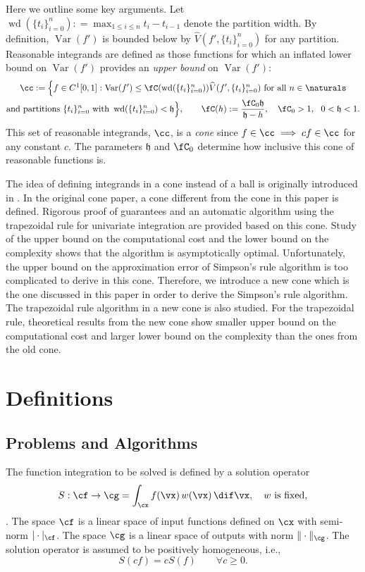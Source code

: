 \documentclass[]{elsarticle}
\DeclareMathOperator{\Var}{Var}
\theoremstyle{definition}
\theoremstyle{remark}
\DeclareMathOperator{\size}{wd}
\newcommand{\hV}{\widehat{V}}
\newcommand{\hcut}{\mathfrak{h}}
\begin{document}
Here we outline some key arguments.  Let
$\size(\{t_i\}_{i=0}^n) : = \max_{1 \le i \le n} t_i - t_{i-1}$ denote the partition width.  By
definition, $\Var(f')$ is bounded below by $\widehat{V}(f',\{t_i\}_{i=0}^n)$ for any partition.
Reasonable integrands are defined as those functions for which an inflated lower bound on
$\Var(f')$ provides an \emph{upper bound} on $\Var(f')$:
\begin{multline} \label{conedef}
\cc := \Bigl \{ f \in C^1[0,1]: \Var(f') \le \fC(\size(\{t_i\}_{i=0}^n)) \hV(f',\{t_i\}_{i=0}^n) \text{ for all }   n
\in \naturals \\
 \text{and partitions } \{t_i\}_{i=0}^n \text{ with }
\size(\{t_i\}_{i=0}^n) < \hcut \Bigr \}, \qquad  \fC(h) := \frac{\fC_0 \hcut}{\hcut - h}, \quad \fC_0
> 1, \
\ 0 < \hcut < 1.
\end{multline}
This set of reasonable integrands, $\cc$, is a \emph{cone} since $f \in \cc \implies cf \in \cc$
for any constant $c$.  The parameters $\hcut$ and $\fC_0$ determine how inclusive this cone of reasonable functions is.

The idea of defining integrands in a cone instead of a ball is originally introduced in \cite{HicEtal14b}. In the original cone paper, a cone different from the cone in this paper is defined. Rigorous proof of guarantees and an automatic algorithm using the trapezoidal rule for univariate integration are provided based on this cone. Study of the upper bound on the computational cost and the lower bound on the complexity shows that the algorithm is asymptotically optimal. Unfortunately, the upper bound on the approximation error of Simpson's rule algorithm is too complicated to derive in this cone. Therefore, we introduce a new cone which is the one discussed in this paper in order to derive the Simpson's rule algorithm. The trapezoidal rule algorithm in a new cone is also studied. For the trapezoidal rule, theoretical results from the new cone show smaller upper bound on the computational cost and larger lower bound on the complexity than the ones from the old cone.



\section{Definitions}
\subsection{Problems and Algorithms} The function integration to be solved is defined by a solution operator
$$
S:\cf \to \cg = \int_{\cx} f(\vx) \, w(\vx) \, \dif \vx, \quad w \text{ is fixed,}
$$.
The space $\cf$ is a linear space of input functions defined on $\cx$ with semi-norm $|\cdot|_{\cf}$. The space $\cg$ is a linear space of outputs with norm $\|\cdot\|_{\cg}$.
The solution operator is assumed to be positively homogeneous, i.e.,
\[
S(cf) = cS(f) \qquad \forall c\ge 0.
\]
\end{document}
